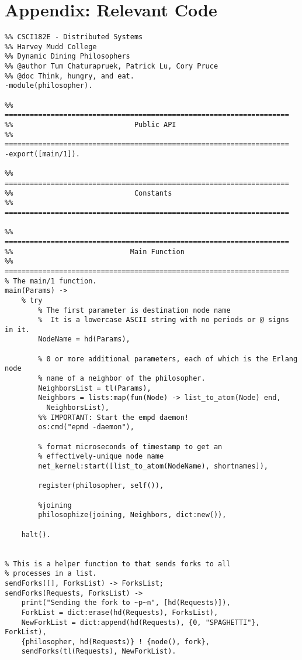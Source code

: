\documentclass[11pt]{article}
\begin{document}
\section{Appendix: Relevant Code}
\begin{lstlisting}
%% CSCI182E - Distributed Systems
%% Harvey Mudd College
%% Dynamic Dining Philosophers
%% @author Tum Chaturapruek, Patrick Lu, Cory Pruce
%% @doc Think, hungry, and eat.
-module(philosopher).

%% ====================================================================
%%                             Public API
%% ====================================================================
-export([main/1]).

%% ====================================================================
%%                             Constants
%% ====================================================================

%% ====================================================================
%%                            Main Function
%% ====================================================================
% The main/1 function.
main(Params) ->
    % try 
        % The first parameter is destination node name
        %  It is a lowercase ASCII string with no periods or @ signs in it.
        NodeName = hd(Params),

        % 0 or more additional parameters, each of which is the Erlang node
        % name of a neighbor of the philosopher.
        NeighborsList = tl(Params),
        Neighbors = lists:map(fun(Node) -> list_to_atom(Node) end, 
          NeighborsList), 
        %% IMPORTANT: Start the empd daemon!
        os:cmd("epmd -daemon"),

        % format microseconds of timestamp to get an 
        % effectively-unique node name
        net_kernel:start([list_to_atom(NodeName), shortnames]),

        register(philosopher, self()),

        %joining
        philosophize(joining, Neighbors, dict:new()),

    halt().


% This is a helper function to that sends forks to all
% processes in a list.
sendForks([], ForksList) -> ForksList;
sendForks(Requests, ForksList) ->
    print("Sending the fork to ~p~n", [hd(Requests)]),
    ForkList = dict:erase(hd(Requests), ForksList),
    NewForkList = dict:append(hd(Requests), {0, "SPAGHETTI"}, ForkList),
    {philosopher, hd(Requests)} ! {node(), fork},
    sendForks(tl(Requests), NewForkList).


\end{lstlisting}
\end{document}
